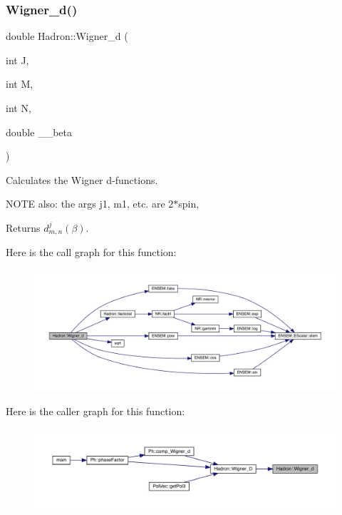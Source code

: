 \subsubsection{\texorpdfstring{Wigner\_d()}{Wigner\_d()}}
{\footnotesize\ttfamily double Hadron\+::\+Wigner\+\_\+d (\begin{DoxyParamCaption}\item[{int}]{J,  }\item[{int}]{M,  }\item[{int}]{N,  }\item[{double}]{\+\_\+\+\_\+beta }\end{DoxyParamCaption})}

Calculates the Wigner d-\/functions.

N\+O\+TE also\+: the args j1, m1, etc. are 2$\ast$spin,

\begin{DoxyReturn}{Returns}
$d^{j}_{m,n}(\beta)$. 
\end{DoxyReturn}
Here is the call graph for this function\+:
\nopagebreak
\begin{figure}[H]
\begin{center}
\leavevmode
\includegraphics[width=350pt]{d1/daf/namespaceHadron_a63c49af65c1d943a78205d3b8b63079a_cgraph}
\end{center}
\end{figure}
Here is the caller graph for this function\+:
\nopagebreak
\begin{figure}[H]
\begin{center}
\leavevmode
\includegraphics[width=350pt]{d1/daf/namespaceHadron_a63c49af65c1d943a78205d3b8b63079a_icgraph}
\end{center}
\end{figure}
\mbox{\label{namespaceHadron_a4d99a17c00bdddfc88a14c0571b74338}} 
